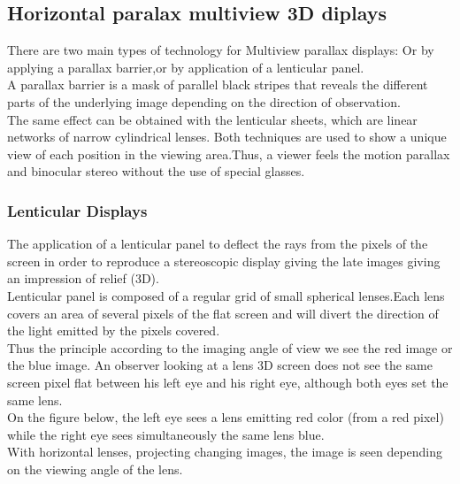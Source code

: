 
\subsection{Horizontal paralax multiview 3D diplays} 

There are two main types of technology for Multiview parallax displays: Or by applying a parallax barrier,or by application of a lenticular panel.\\
A parallax barrier is a mask of parallel black stripes that reveals the different parts of the underlying image depending on the direction of observation.\\ The same effect can be obtained with the lenticular sheets, which are linear networks of narrow cylindrical lenses. Both techniques are used to show a unique view of each position in the viewing area.Thus, a viewer feels the motion parallax and binocular stereo without the use of special glasses. 

\subsubsection{Lenticular Displays}

The application of a lenticular panel to deflect the rays from the pixels of the screen in order to reproduce a stereoscopic display giving the late images giving an impression of relief (3D).\\ Lenticular panel is composed of a regular grid of small spherical lenses.Each lens covers an area of several pixels of the flat screen and will divert the direction of the light emitted by the pixels covered.\\
Thus the principle according to the imaging angle of view we see the red image or the blue image. An observer looking at a lens 3D screen does not see the same screen pixel flat between his left eye and his right eye, although both eyes set the same lens.\\
On the figure below, the left eye sees a lens emitting red color (from a red pixel) while the right eye sees simultaneously the same lens blue.\\
With horizontal lenses, projecting changing images, the image is seen depending on the viewing angle of the lens.

